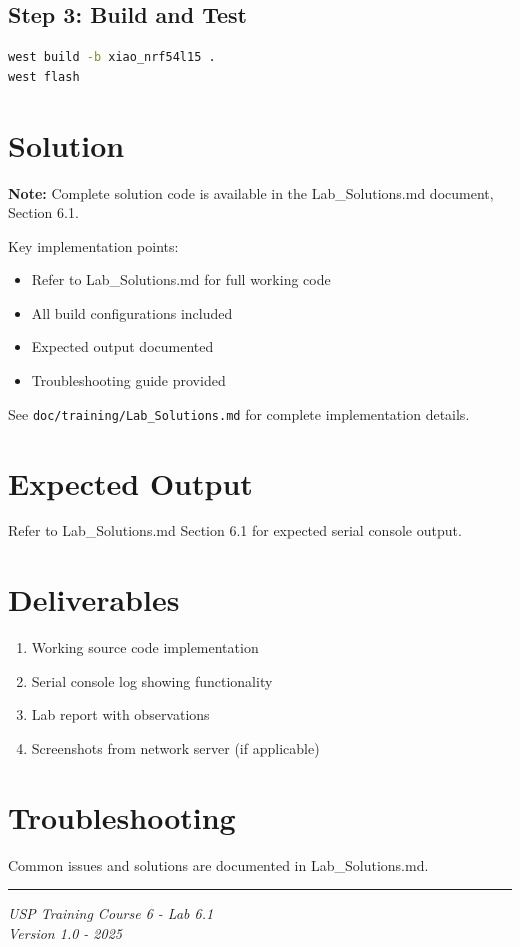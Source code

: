 \documentclass[11pt,a4paper]{article}
\begin{document}
\subsection{Step 3: Build and Test}
\begin{lstlisting}[language=bash]
west build -b xiao_nrf54l15 .
west flash
\end{lstlisting}

\section{Solution}

\begin{solutionbox}
\textbf{Note:} Complete solution code is available in the Lab\_Solutions.md document, Section 6.1.

Key implementation points:
\begin{itemize}
    \item Refer to Lab\_Solutions.md for full working code
    \item All build configurations included
    \item Expected output documented
    \item Troubleshooting guide provided
\end{itemize}

See \texttt{doc/training/Lab\_Solutions.md} for complete implementation details.
\end{solutionbox}

\section{Expected Output}

Refer to Lab\_Solutions.md Section 6.1 for expected serial console output.

\section{Deliverables}

\begin{enumerate}[itemsep=10pt]
    \item Working source code implementation
    \item Serial console log showing functionality
    \item Lab report with observations
    \item Screenshots from network server (if applicable)
\end{enumerate}

\section{Troubleshooting}

Common issues and solutions are documented in Lab\_Solutions.md.

\vfill
\noindent\rule{\textwidth}{0.4pt}
\begin{center}
\textit{USP Training Course 6 - Lab 6.1}\\
\textit{Version 1.0 - 2025}
\end{center}
\end{document}
